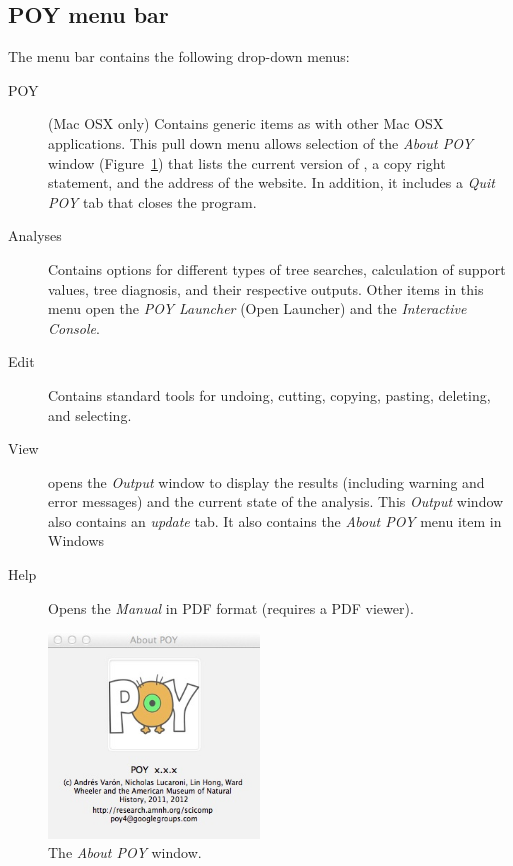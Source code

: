 \subsection{POY menu bar}
The menu bar contains the following drop-down menus:
\begin{description}
\item[POY] (Mac OSX only) Contains generic items as with other Mac OSX applications. This pull down 
menu allows selection of the \emph{About POY} window (Figure~\ref{fig:about_window}) that lists the 
current version of \poy, a copy right statement, and the address of the \poy website. In addition, it includes 
a \emph{Quit POY} tab that closes the program. 
\item[Analyses]    Contains options for different types of tree searches, calculation of support values, tree 
diagnosis, and their respective outputs. Other items in this menu open the \emph{POY Launcher} 
(Open Launcher) and the \emph{Interactive Console}.
\item[Edit] Contains standard tools for undoing, cutting, copying, pasting, deleting, and selecting.
\item[View] opens the \emph{Output} window to display the results (including warning and error messages) 
and the current state of the analysis. This \emph{Output} window also contains an \emph{update} tab.  
It also contains the \emph{About POY} menu item in Windows %
\item[Help] Opens the \poy \emph{Manual} in PDF format (requires a PDF viewer).
\end{description}

\begin{figure}[htpb]
    \begin{center}
        \includegraphics[width=0.5\textwidth]{doc/figures/about_window.jpg}
    \end{center}
    \caption{The \emph{About POY} window.}
    \label{fig:about_window}
        
\end{figure}

